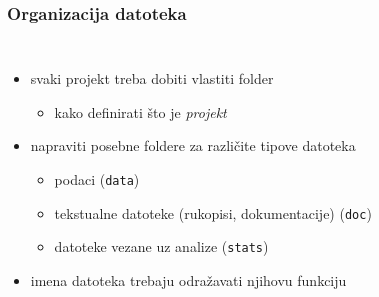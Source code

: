 \documentclass[aspectratio=169]{beamer}
\newenvironment{noheadline}{
    \setbeamertemplate{headline}{}
}{}
\begin{document}
\begin{noheadline}
    \begin{frame}
        \frametitle{Organizacija datoteka}

        \begin{columns}

            \begin{itemize}
                \setlength{\itemsep}{2em}

                \item svaki projekt treba dobiti vlastiti folder

                \begin{itemize}
                    \item kako definirati što je \textit{projekt}
                \end{itemize}

                \pause

                \item napraviti posebne foldere za različite tipove datoteka

                \begin{itemize}
                    \item podaci (\texttt{data})

                    \item tekstualne datoteke (rukopisi, dokumentacije)
                        (\texttt{doc})

                    \item datoteke vezane uz analize (\texttt{stats})
                \end{itemize}

                \pause

                \item imena datoteka trebaju odražavati njihovu funkciju
            \end{itemize}
            
            \pause



\end{columns}
\end{frame}
\end{noheadline}
\end{document}
